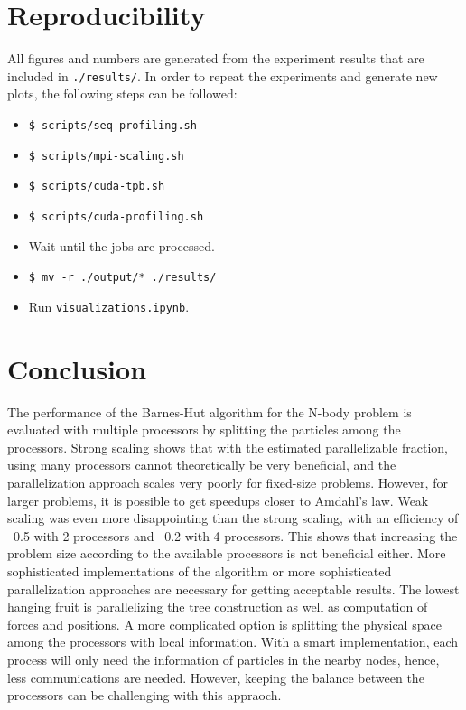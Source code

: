 \documentclass[10pt,journal,compsocconf]{IEEEtran}
\newcommand{\code}[1]{\texttt{#1}}
\begin{document}
\section{Reproducibility}

All figures and numbers are generated from the experiment results that are included in \code{./results/}. In order to repeat the experiments and generate new plots, the following steps can be followed:
\begin{itemize}
    \item \code{\$ scripts/seq-profiling.sh}
    \item \code{\$ scripts/mpi-scaling.sh}
    \item \code{\$ scripts/cuda-tpb.sh}
    \item \code{\$ scripts/cuda-profiling.sh}
    \item Wait until the jobs are processed.
    \item \code{\$ mv -r ./output/* ./results/}
    \item Run \code{visualizations.ipynb}.
\end{itemize}

\section{Conclusion}

The performance of the Barnes-Hut algorithm for the N-body problem is evaluated with multiple processors by splitting the particles among the processors. Strong scaling shows that with the estimated parallelizable fraction, using many processors cannot theoretically be very beneficial, and the parallelization approach scales very poorly for fixed-size problems. However, for larger problems, it is possible to get speedups closer to Amdahl's law. Weak scaling was even more disappointing than the strong scaling, with an efficiency of ~0.5 with 2 processors and ~0.2 with 4 processors. This shows that increasing the problem size according to the available processors is not beneficial either. More sophisticated implementations of the algorithm or more sophisticated parallelization approaches are necessary for getting acceptable results. The lowest hanging fruit is parallelizing the tree construction as well as computation of forces and positions. A more complicated option is splitting the physical space among the processors with local information. With a smart implementation, each process will only need the information of particles in the nearby nodes, hence, less communications are needed. However, keeping the balance between the processors can be challenging with this appraoch.
\end{document}
